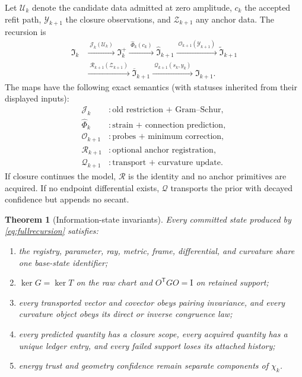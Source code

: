 \documentclass[10pt,twocolumn]{article}
\newtheorem{theorem}{Theorem}[section]
\theoremstyle{definition}
\theoremstyle{remark}
\newcommand{\Id}{\mathrm I}
\begin{document}
Let $\mathcal U_k$ denote the candidate data admitted at zero amplitude, $c_k$ the accepted refit path, $\mathcal Y_{k+1}$ the closure observations, and $\mathcal Z_{k+1}$ any anchor data.  The recursion is
\begin{align}
 \mathfrak I_k
 &\xrightarrow{\;\mathcal J_k(\mathcal U_k)\;}
 \mathfrak I_k^+
 \xrightarrow{\;\widehat\Phi_k(c_k)\;}
 \widehat{\mathfrak I}_{k+1}
 \xrightarrow{\;\mathcal O_{k+1}(\mathcal Y_{k+1})\;}
 \widetilde{\mathfrak I}_{k+1}\nonumber\\
 &\xrightarrow{\;\mathcal R_{k+1}(\mathcal Z_{k+1})\;}
 \overline{\mathfrak I}_{k+1}
 \xrightarrow{\;\mathcal Q_{k+1}(s_k,y_k)\;}
 \mathfrak I_{k+1}.
 \label{eq:fullrecursion}
\end{align}
The maps have the following exact semantics (with statuses inherited from
their displayed inputs):
\begin{align}
 \mathcal J_k &: \text{old restriction + Gram--Schur},\nonumber\\
 \widehat\Phi_k &: \text{strain + connection prediction},\nonumber\\
 \mathcal O_{k+1} &: \text{probes + minimum correction},\nonumber\\
 \mathcal R_{k+1} &: \text{optional anchor registration},\nonumber\\
 \mathcal Q_{k+1} &: \text{transport + curvature update}.
 \label{eq:mapsemantics}
\end{align}
If closure continues the model, $\mathcal R$ is the identity and no anchor primitives are acquired.  If no endpoint differential exists, $\mathcal Q$ transports the prior with decayed confidence but appends no secant.

\begin{theorem}[Information-state invariants]
Every committed state produced by \eqref{eq:fullrecursion} satisfies:
\begin{enumerate}[label=(\roman*)]
\item the registry, parameter, ray, metric, frame, differential, and curvature share one base-state identifier;
\item $\ker G=\ker T$ on the raw chart and $O^{\mathsf T}GO=\Id$ on retained support;
\item every transported vector and covector obeys pairing invariance, and every curvature object obeys its direct or inverse congruence law;
\item every predicted quantity has a closure scope, every acquired quantity has a unique ledger entry, and every failed support loses its attached history;
\item energy trust and geometry confidence remain separate components of $\chi_k$.
\end{enumerate}
\end{theorem}
\end{document}

